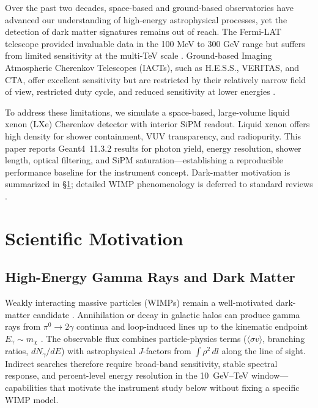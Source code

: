 \documentclass{aastex701}
\begin{document}
Over the past two decades, space-based and ground-based observatories have advanced our understanding of high-energy astrophysical processes, yet the detection of dark matter signatures remains out of reach. The Fermi-LAT telescope provided invaluable data in the 100 MeV to 300 GeV range but suffers from limited sensitivity at the multi-TeV scale \cite{Atwood2009}. Ground-based Imaging Atmospheric Cherenkov Telescopes (IACTs), such as H.E.S.S., VERITAS, and CTA, offer excellent sensitivity but are restricted by their relatively narrow field of view, restricted duty cycle, and reduced sensitivity at lower energies \cite{weekes2002veritas}.

To address these limitations, we simulate a space-based, large-volume liquid xenon (LXe) Cherenkov detector with interior SiPM readout. Liquid xenon offers high density for shower containment, VUV transparency, and radiopurity. This paper reports Geant4~11.3.2 results for photon yield, energy resolution, shower length, optical filtering, and SiPM saturation---establishing a reproducible performance baseline for the instrument concept. Dark-matter motivation is summarized in \S\ref{sec:motivation}; detailed WIMP phenomenology is deferred to standard reviews \cite{Bertone2005,Jungman1996}.

\section{Scientific Motivation}\label{sec:motivation}

\subsection{High-Energy Gamma Rays and Dark Matter}\label{WIMP}

Weakly interacting massive particles (WIMPs) remain a well-motivated dark-matter candidate \cite{Bertone2005,Jungman1996}. Annihilation or decay in galactic halos can produce gamma rays from $\pi^0\rightarrow 2\gamma$ continua and loop-induced lines up to the kinematic endpoint $E_\gamma \sim m_\chi$ \cite{Cirelli:2011PPPC,Funk2015}. The observable flux combines particle-physics terms ($\langle\sigma v\rangle$, branching ratios, $dN_\gamma/dE$) with astrophysical $J$-factors from $\int \rho^2\, dl$ along the line of sight. Indirect searches therefore require broad-band sensitivity, stable spectral response, and percent-level energy resolution in the 10~GeV--TeV window---capabilities that motivate the instrument study below without fixing a specific WIMP model.
\end{document}
